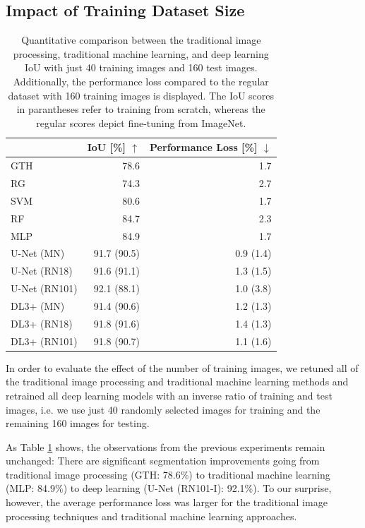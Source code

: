 \documentclass{isprs} %
\begin{document}
\subsection{Impact of Training Dataset Size}
\setlength{\extrarowheight}{3pt}
\begin{table}[t!]
\begin{center}
\begin{tabular}{lrr}
& IoU [\%] $\uparrow$ & Performance Loss [\%] $\downarrow$ \\ \hline 
GTH & 78.6 & 1.7 \\
RG & 74.3 & 2.7\\ \hdashline
SVM & 80.6 & 1.7 \\
RF & 84.7 & 2.3 \\
MLP & 84.9 & 1.7 \\ \hdashline
U-Net (MN) & 91.7 (90.5) & 0.9 (1.4) \\
U-Net (RN18) & 91.6 (91.1) & 1.3 (1.5) \\
U-Net (RN101) & 92.1 (88.1) & 1.0 (3.8) \\
DL3+ (MN) & 91.4 (90.6) & 1.2 (1.3) \\
DL3+ (RN18) & 91.8 (91.6) & 1.4 (1.3) \\
DL3+ (RN101) & 91.8 (90.7) & 1.1 (1.6) \\
\end{tabular}
\end{center}
\caption{Quantitative comparison between the traditional image processing, traditional machine learning, and deep learning IoU with just 40 training images and 160 test images. Additionally, the performance loss compared to the regular dataset with 160 training images is displayed. The IoU scores in parantheses refer to training from scratch, whereas the regular scores depict fine-tuning from ImageNet.}
\label{quantitative_comparison_dataset_a}
\end{table}

In order to evaluate the effect of the number of training images, we retuned all of the traditional image processing and traditional machine learning methods and retrained all deep learning models with an inverse ratio of training and test images, i.e. we use just 40 randomly selected images for training and the remaining 160 images for testing.

As Table \ref{quantitative_comparison_dataset_a} shows, the observations from the previous experiments remain unchanged: There are significant segmentation improvements going from traditional image processing (GTH: 78.6\%) to traditional machine learning (MLP: 84.9\%) to deep learning (U-Net (RN101-I): 92.1\%). To our surprise, however, the average performance loss was larger for the traditional image processing techniques and traditional machine learning approaches.
\end{document}
